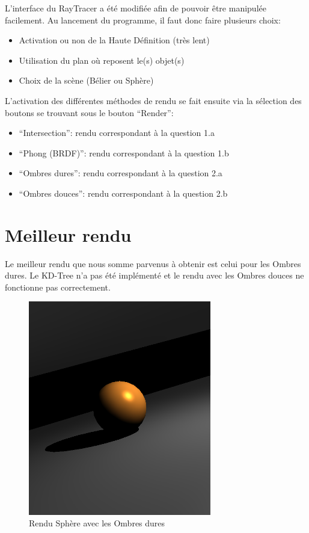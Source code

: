 \documentclass[a4paper,11pt,titlepage]{article}
\begin{document}
L'interface du RayTracer a été modifiée afin de pouvoir être manipulée facilement. Au lancement du programme, il faut donc faire plusieurs choix:
\begin{itemize}
 \item Activation ou non de la Haute Définition (très lent)
 \item Utilisation du plan où reposent le(s) objet(s)
 \item Choix de la scène (Bélier ou Sphère)\\
\end{itemize}

L'activation des différentes méthodes de rendu se fait ensuite via la sélection des boutons se trouvant sous le bouton ``Render'':
\begin{itemize}
 \item ``Intersection'': rendu correspondant à la question 1.a
 \item ``Phong (BRDF)'': rendu correspondant à la question 1.b
 \item ``Ombres dures'': rendu correspondant à la question 2.a
 \item ``Ombres douces'': rendu correspondant à la question 2.b
\end{itemize}

\section{Meilleur rendu}

Le meilleur rendu que nous somme parvenus à obtenir est celui pour les Ombres dures.
Le KD-Tree n'a pas été implémenté et le rendu avec les Ombres douces ne fonctionne pas correctement.

\begin{figure}[H]
 \begin{center}
 \includegraphics[width=8cm]{Rendu/OmbresDS.png}
 \end{center}

 \caption{Rendu Sphère avec les Ombres dures}
 \label{rendu5}
\end{figure}
\end{document}
